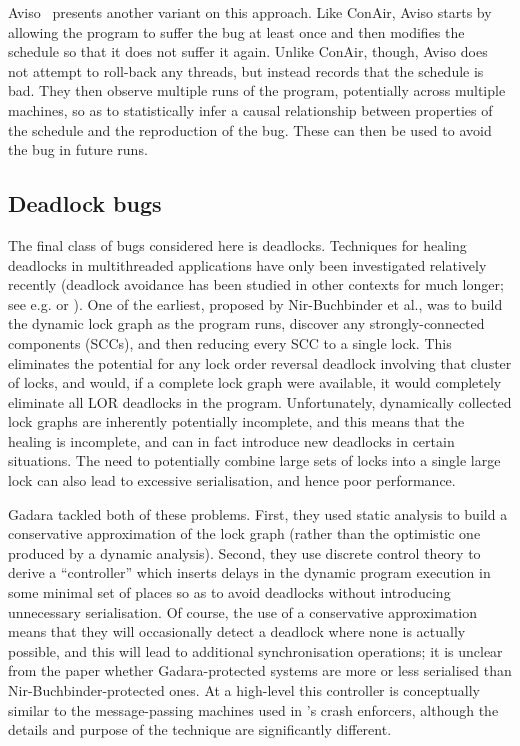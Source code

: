 Aviso~\cite{Lucia2013} presents another variant on this approach.
Like ConAir, Aviso starts by allowing the program to suffer the bug at
least once and then modifies the schedule so that it does not suffer
it again.  Unlike ConAir, though, Aviso does not attempt to roll-back
any threads, but instead records that the schedule is bad.  They then
observe multiple runs of the program, potentially across multiple
machines, so as to statistically infer a causal relationship between
properties of the schedule and the reproduction of the bug.  These can
then be used to avoid the bug in future runs.

\subsection{Deadlock bugs}
The final class of bugs considered here is deadlocks.  Techniques for
healing deadlocks in multithreaded applications have only been
investigated relatively recently (deadlock avoidance has been studied
in other contexts for much longer; see e.g. \cite{Viswanadham1990} or
\cite{Dijkstra2004}).  One of the earliest, proposed by Nir-Buchbinder
et al.\cite{Nir-Buchbinder2008}, was to build the dynamic lock graph
as the program runs, discover any strongly-connected components
(SCCs), and then reducing every SCC to a single lock.  This eliminates
the potential for any lock order reversal deadlock involving that
cluster of locks, and would, if a complete lock graph were available,
it would completely eliminate all LOR deadlocks in the program.
Unfortunately, dynamically collected lock graphs are inherently
potentially incomplete, and this means that the healing is incomplete,
and can in fact introduce new deadlocks in certain situations.  The
need to potentially combine large sets of locks into a single large
lock can also lead to excessive serialisation, and hence poor
performance.

Gadara\cite{Wang2008} tackled both of these problems.  First, they
used static analysis to build a conservative approximation of the lock
graph (rather than the optimistic one produced by a dynamic analysis).
Second, they use discrete control theory to derive a ``controller''
which inserts delays in the dynamic program execution in some minimal
set of places so as to avoid deadlocks without introducing unnecessary
serialisation.  Of course, the use of a conservative approximation
means that they will occasionally detect a deadlock where none is
actually possible, and this will lead to additional synchronisation
operations; it is unclear from the paper whether Gadara-protected
systems are more or less serialised than Nir-Buchbinder-protected
ones.  At a high-level this controller is conceptually similar to the
message-passing machines used in {\technique}'s crash enforcers,
although the details and purpose of the technique are significantly
different.

